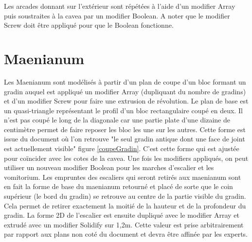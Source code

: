 Les arcades donnant sur l'extérieur sont répétées à l'aide d'un modifier Array puis soustraites à la cavea par un modifier Boolean. A noter que le modifier Screw doit être appliqué pour que le Boolean fonctionne.

		\section{Maenianum} 

Les Maenianum sont modélisés à partir d'un plan de coupe d'un bloc formant un gradin auquel est appliqué un modifier Array (dupliquant du nombre de gradins) et d'un modifier Screw pour faire une extrusion de révolution. Le plan de base est un quasi-triangle représentant le profil d'un bloc rectangulaire coupé en deux. Il n'est pas coupé le long de la diagonale car une partie plate d'une dizaine de centimètre permet de faire reposer les bloc les une sur les autres. Cette forme est issue du document \cite{ref} où l'on retrouve "le seul gradin antique dont une face de joint est actuellement visible" figure \ref{coupeGradin}. C'est cette forme qui est ajustée pour coïncider avec les cotes de la cavea. Une fois les modifiers appliqués, on peut utiliser un nouveau modifier Boolean pour les marches d'escalier et les vomitorium. Les empruntes des escaliers qui seront retirés aux maenianum sont en fait la forme de base du maenianum retourné et placé de sorte que le coin supérieur (le bord du gradin) se retrouve au centre de la partie visible du gradin. Cela permet de retirer exactement la moitié de la hauteur et de la profondeur du gradin. La forme 2D de l'escalier est ensuite dupliqué avec le modifier Array et extrudé avec un modifier Solidify sur 1,2m. Cette valeur est prise arbitrairement par rapport aux plans non coté du document \cite{ref2} et devra être affinée par les experts.


